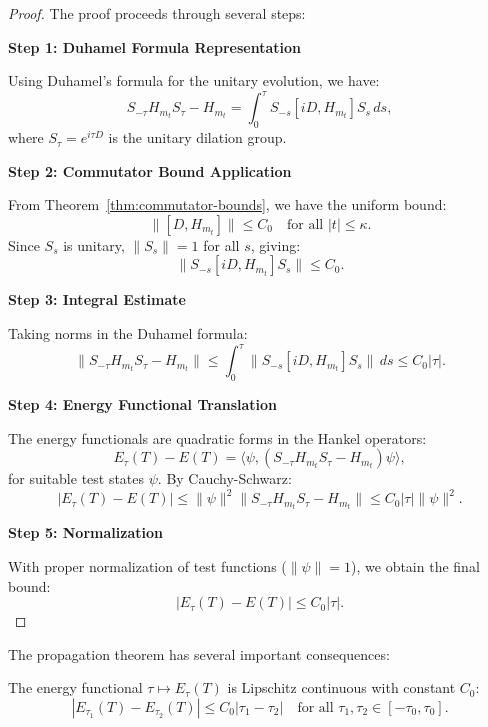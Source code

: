 \documentclass[11pt,hyp,]{nyjm}
\begin{document}
\begin{proof}
The proof proceeds through several steps:

\vspace{0.5em}
\noindent\textbf{Step 1: Duhamel Formula Representation}

Using Duhamel's formula for the unitary evolution, we have:
\[
S_{-\tau} H_{m_t} S_\tau - H_{m_t} = \int_0^\tau S_{-s} [iD, H_{m_t}] S_s \, ds,
\]
where $S_\tau = e^{i\tau D}$ is the unitary dilation group.

\vspace{0.5em}
\noindent\textbf{Step 2: Commutator Bound Application}

From Theorem~\ref{thm:commutator-bounds}, we have the uniform bound:
\[
\|[D, H_{m_t}]\| \leq C_0 \quad \text{for all } |t| \leq \kappa.
\]
Since $S_s$ is unitary, $\|S_s\| = 1$ for all $s$, giving:
\[
\|S_{-s} [iD, H_{m_t}] S_s\| \leq C_0.
\]

\vspace{0.5em}
\noindent\textbf{Step 3: Integral Estimate}

Taking norms in the Duhamel formula:
\[
\|S_{-\tau} H_{m_t} S_\tau - H_{m_t}\| \leq \int_0^\tau \|S_{-s} [iD, H_{m_t}] S_s\| \, ds \leq C_0 |\tau|.
\]

\vspace{0.5em}
\noindent\textbf{Step 4: Energy Functional Translation}

The energy functionals are quadratic forms in the Hankel operators:
\[
E_\tau(T) - E(T) = \langle \psi, (S_{-\tau} H_{m_t} S_\tau - H_{m_t}) \psi \rangle,
\]
for suitable test states $\psi$. By Cauchy-Schwarz:
\[
|E_\tau(T) - E(T)| \leq \|\psi\|^2 \|S_{-\tau} H_{m_t} S_\tau - H_{m_t}\| \leq C_0 |\tau| \|\psi\|^2.
\]

\vspace{0.5em}
\noindent\textbf{Step 5: Normalization}

With proper normalization of test functions ($\|\psi\| = 1$), we obtain the final bound:
\[
|E_\tau(T) - E(T)| \leq C_0 |\tau|.
\]
\end{proof}

The propagation theorem has several important consequences:

\begin{corollary}\label{cor:lipschitz}
The energy functional $\tau \mapsto E_\tau(T)$ is Lipschitz continuous with constant $C_0$:
\[
|E_{\tau_1}(T) - E_{\tau_2}(T)| \leq C_0 |\tau_1 - \tau_2| \quad \text{for all } \tau_1, \tau_2 \in [-\tau_0, \tau_0].
\]
\end{corollary}
\end{document}
